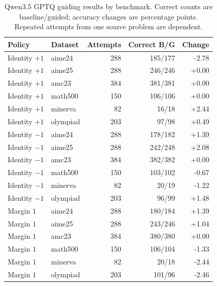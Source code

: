 \begin{table}[ht]
\centering\small
\caption{Qwen3.5 GPTQ guiding results by benchmark. Correct counts are baseline/guided; accuracy changes are percentage points. Repeated attempts from one source problem are dependent.}
\label{tab:guiding-datasets}
\begin{tabular}{llrrr}
\toprule
Policy & Dataset & Attempts & Correct B/G & Change \\
\midrule
Identity $+1$ & aime24 & 288 & 185/177 & -2.78 \\
Identity $+1$ & aime25 & 288 & 246/246 & +0.00 \\
Identity $+1$ & amc23 & 384 & 381/381 & +0.00 \\
Identity $+1$ & math500 & 150 & 106/106 & +0.00 \\
Identity $+1$ & minerva & 82 & 16/18 & +2.44 \\
Identity $+1$ & olympiad & 203 & 97/98 & +0.49 \\
Identity $-1$ & aime24 & 288 & 178/182 & +1.39 \\
Identity $-1$ & aime25 & 288 & 242/248 & +2.08 \\
Identity $-1$ & amc23 & 384 & 382/382 & +0.00 \\
Identity $-1$ & math500 & 150 & 103/102 & -0.67 \\
Identity $-1$ & minerva & 82 & 20/19 & -1.22 \\
Identity $-1$ & olympiad & 203 & 96/99 & +1.48 \\
Margin $1$ & aime24 & 288 & 180/184 & +1.39 \\
Margin $1$ & aime25 & 288 & 243/246 & +1.04 \\
Margin $1$ & amc23 & 384 & 380/380 & +0.00 \\
Margin $1$ & math500 & 150 & 106/104 & -1.33 \\
Margin $1$ & minerva & 82 & 20/18 & -2.44 \\
Margin $1$ & olympiad & 203 & 101/96 & -2.46 \\
\bottomrule
\end{tabular}
\end{table}
